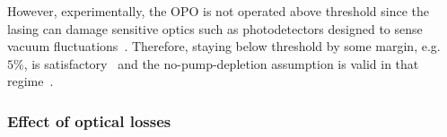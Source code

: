 However, experimentally, the OPO is not operated above threshold since the lasing can damage sensitive optics such as photodetectors designed to sense vacuum fluctuations~\cite{}. Therefore, staying below threshold by some margin, e.g.\ $5\%$, is satisfactory~\cite{} and the no-pump-depletion assumption is valid in that regime~\cite{}. %

\subsubsection{Effect of optical losses}

